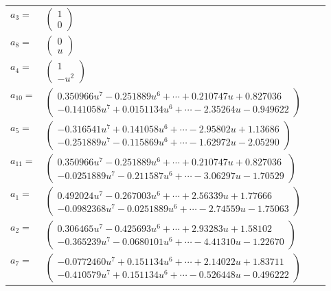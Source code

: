 \documentclass[1p]{elsarticle_modified}
\theoremstyle{definition}
\begin{document}
\begin{tabular}{m{7pt} m{180pt} m{7pt} m{180pt} }
\flushright $a_{3}=$&$\begin{pmatrix}1\\0\end{pmatrix}$ \\
\flushright $a_{8}=$&$\begin{pmatrix}0\\u\end{pmatrix}$ \\
\flushright $a_{4}=$&$\begin{pmatrix}1\\- u^2\end{pmatrix}$ \\
\flushright $a_{10}=$&$\begin{pmatrix}0.350966 u^{7}-0.251889 u^{6}+\cdots+0.210747 u+0.827036\\-0.141058 u^{7}+0.0151134 u^{6}+\cdots-2.35264 u-0.949622\end{pmatrix}$ \\
\flushright $a_{5}=$&$\begin{pmatrix}-0.316541 u^{7}+0.141058 u^{6}+\cdots-2.95802 u+1.13686\\-0.251889 u^{7}-0.115869 u^{6}+\cdots-1.62972 u-2.05290\end{pmatrix}$ \\
\flushright $a_{11}=$&$\begin{pmatrix}0.350966 u^{7}-0.251889 u^{6}+\cdots+0.210747 u+0.827036\\-0.0251889 u^{7}-0.211587 u^{6}+\cdots-3.06297 u-1.70529\end{pmatrix}$ \\
\flushright $a_{1}=$&$\begin{pmatrix}0.492024 u^{7}-0.267003 u^{6}+\cdots+2.56339 u+1.77666\\-0.0982368 u^{7}-0.0251889 u^{6}+\cdots-2.74559 u-1.75063\end{pmatrix}$ \\
\flushright $a_{2}=$&$\begin{pmatrix}0.306465 u^{7}-0.425693 u^{6}+\cdots+2.93283 u+1.58102\\-0.365239 u^{7}-0.0680101 u^{6}+\cdots-4.41310 u-1.22670\end{pmatrix}$ \\
\flushright $a_{7}=$&$\begin{pmatrix}-0.0772460 u^{7}+0.151134 u^{6}+\cdots+2.14022 u+1.83711\\-0.410579 u^{7}+0.151134 u^{6}+\cdots-0.526448 u-0.496222\end{pmatrix}$ \\

\end{tabular}
\end{document}
